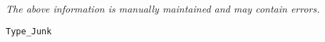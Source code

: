 \label{pkg:type\_junk}

{\tiny \it The above information is manually maintained and may contain errors.}
\begin{verbatim}
Type_Junk
\end{verbatim}
